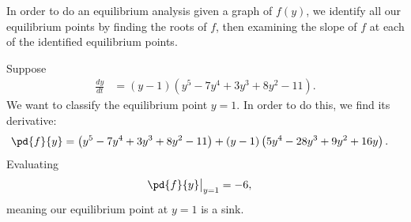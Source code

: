 \documentclass[10pt]{mypackage}
\begin{document}
\begin{remark}
  In order to do an equilibrium analysis given a graph of $f(y)$, we identify all our equilibrium points by finding the roots of $f$, then examining the slope of $f$ at each of the identified equilibrium points.
\end{remark}
\begin{example}
  Suppose
  \begin{align*}
    \frac{dy}{dt} &= \left(y-1\right)\left(y^5 - 7y^4 + 3y^3 + 8y^2 - 11\right).
  \end{align*}
  We want to classify the equilibrium point $y=1$. In order to do this, we find its derivative:
  \begin{align*}
    \pd{f}{y} &= \left(y^5 - 7y^4 + 3y^3 + 8y^2 - 11\right) + \left(y-1\right)\left(5y^4 - 28y^3 + 9y^2 + 16y\right).
  \end{align*}
  Evaluating
  \begin{align*}
    \pd{f}{y}\bigr\vert_{y=1} &= -6,
  \end{align*}
  meaning our equilibrium point at $y=1$ is a sink.
\end{example}
\end{document}
